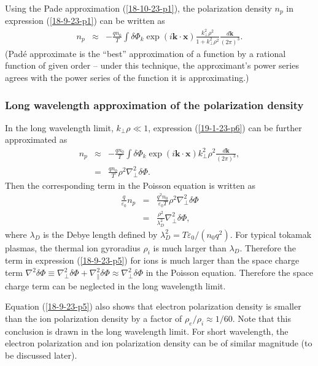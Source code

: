 \documentclass{llncs}
\begin{document}
Using the Pade approximation (\ref{18-10-23-p1}), the polarization density
$n_p$ in expression (\ref{18-9-23-p1}) can be written as
\begin{eqnarray}
  n_p & \approx & - \frac{q n_0}{T} \int \delta \Phi_k \exp (i\mathbf{k} \cdot
  \mathbf{x}) \frac{k_{\perp}^2 \rho^2}{1 + k_{\perp}^2 \rho^2}
  \frac{d\mathbf{k}}{(2 \pi)^3} .  \label{19-1-23-p6}
\end{eqnarray}
(Pad{\'e} approximate is the ``best'' approximation of a function by a
rational function of given order -- under this technique, the approximant's
power series agrees with the power series of the function it is
approximating.)

\subsubsection{Long wavelength approximation of the polarization density}

In the long wavelength limit, $k_{\perp} \rho \ll 1$, expression
(\ref{19-1-23-p6}) can be further approximated as
\begin{eqnarray}
  n_p & \approx & - \frac{q n_0}{T} \int \delta \Phi_k \exp (i\mathbf{k} \cdot
  \mathbf{x}) k_{\perp}^2 \rho^2 \frac{d\mathbf{k}}{(2 \pi)^3}, \nonumber\\
  & = & \frac{q n_0}{T} \rho^2 \nabla_{\perp}^2 \delta \Phi . 
  \label{19-1-23-p5}
\end{eqnarray}
Then the corresponding term in the Poisson equation is written as
\begin{eqnarray}
  \frac{q}{\varepsilon_0} n_p & = & \frac{q^2 n_0}{\varepsilon_0 T} \rho^2
  \nabla_{\perp}^2 \delta \Phi \nonumber\\
  & = & \frac{\rho^2}{\lambda_D^2} \nabla_{\perp}^2 \delta \Phi, 
  \label{18-9-23-p5}
\end{eqnarray}
where $\lambda_D$ is the Debye length defined by $\lambda_D^2 = T
\varepsilon_0 / (n_0 q^2)$. For typical tokamak plasmas, the thermal ion
gyroradius $\rho_i$ is much larger than $\lambda_D$. Therefore the term in
expression (\ref{18-9-23-p5}) for ions is much larger than the space charge
term $\nabla^2 \delta \Phi \equiv \nabla^2_{\perp} \delta \Phi +
\nabla^2_{\parallel} \delta \Phi \approx \nabla^2_{\perp} \delta \Phi$ in the
Poisson equation. Therefore the space charge term can be neglected in the long
wavelength limit.

Equation (\ref{18-9-23-p5}) also shows that electron polarization density is
smaller than the ion polarization density by a factor of $\rho_e / \rho_i
\approx 1 / 60$. Note that this conclusion is drawn in the long wavelength
limit. For short wavelength, the electron polarization and ion polarization
density can be of similar magnitude (to be discussed later).
\end{document}
